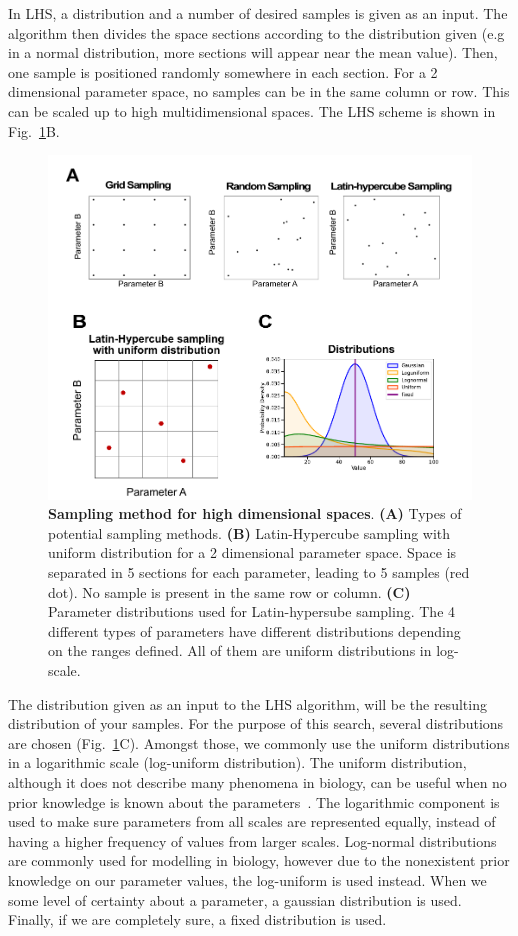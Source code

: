 In LHS, a distribution and a number of desired samples is given as an input.
The algorithm then divides the space sections according to the distribution given (e.g in a normal distribution, more sections will appear near the mean value).
Then, one sample is positioned randomly somewhere in each section.
For a 2 dimensional parameter space, no samples can be in the same column or row.
This can be scaled up to high multidimensional spaces.
The LHS scheme is shown in Fig.~\ref{fig:distributions}B.
\begin{figure}[H]

    \includegraphics[width=1\textwidth]{chapters/Methods/distributions}
    \caption{\textbf{Sampling method for high dimensional spaces}. \textbf{(A)} Types of potential sampling methods. \textbf{(B)} Latin-Hypercube sampling with uniform distribution for a 2 dimensional parameter space. Space is separated in 5 sections for each parameter, leading to 5 samples (red dot). No sample is present in the same row or column. \textbf{(C)} Parameter distributions used for Latin-hypersube sampling. The 4 different types of parameters have different distributions depending on the ranges defined. All of them are uniform distributions in log-scale. }
    \label{fig:distributions}
\end{figure}
The distribution given as an input to the LHS algorithm, will be the resulting distribution of your samples.
For the purpose of this search, several distributions are chosen (Fig.~\ref{fig:distributions}C).
Amongst those, we commonly use the uniform distributions in a logarithmic scale (log-uniform distribution).
The uniform distribution, although it does not describe many phenomena in biology, can be useful when no prior knowledge is known about the parameters~\parencite{Frank2009}.
The logarithmic component is used to make sure parameters from all scales are represented equally, instead of having a higher frequency of values from larger scales.
Log-normal distributions are commonly used for modelling in biology, however due to the nonexistent prior knowledge on our parameter values, the log-uniform is used instead.
When we some level of certainty about a parameter, a gaussian distribution is used.
Finally, if we are completely sure, a fixed distribution is used.

